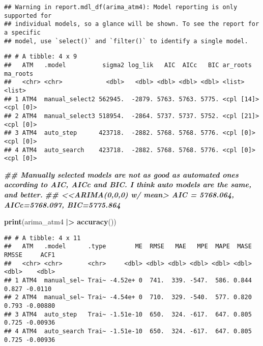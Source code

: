 \documentclass[
]{article}
\newenvironment{Shaded}{\begin{snugshade}}{\end{snugshade}}
\newcommand{\DocumentationTok}[1]{\textcolor[rgb]{0.56,0.35,0.01}{\textbf{\textit{#1}}}}
\newcommand{\FunctionTok}[1]{\textcolor[rgb]{0.13,0.29,0.53}{\textbf{#1}}}
\newcommand{\NormalTok}[1]{#1}
\newcommand{\SpecialCharTok}[1]{\textcolor[rgb]{0.81,0.36,0.00}{\textbf{#1}}}
\begin{document}
\begin{verbatim}
## Warning in report.mdl_df(arima_atm4): Model reporting is only supported for
## individual models, so a glance will be shown. To see the report for a specific
## model, use `select()` and `filter()` to identify a single model.
\end{verbatim}

\begin{verbatim}
## # A tibble: 4 x 9
##   ATM   .model          sigma2 log_lik   AIC  AICc   BIC ar_roots   ma_roots 
##   <chr> <chr>            <dbl>   <dbl> <dbl> <dbl> <dbl> <list>     <list>   
## 1 ATM4  manual_select2 562945.  -2879. 5763. 5763. 5775. <cpl [14]> <cpl [0]>
## 2 ATM4  manual_select3 518954.  -2864. 5737. 5737. 5752. <cpl [21]> <cpl [0]>
## 3 ATM4  auto_step      423718.  -2882. 5768. 5768. 5776. <cpl [0]>  <cpl [0]>
## 4 ATM4  auto_search    423718.  -2882. 5768. 5768. 5776. <cpl [0]>  <cpl [0]>
\end{verbatim}

\begin{Shaded}
\begin{Highlighting}[]
\DocumentationTok{\#\# Manually selected models are not as good as automated ones according to AIC, AICc and BIC. I think auto models are the same, and better.}
\DocumentationTok{\#\# \textless{}\textless{}ARIMA(0,0,0) w/ mean\textgreater{} AIC = 5768.064, AICc=5768.097, BIC=5775.864  }

\FunctionTok{print}\NormalTok{(arima\_atm4 }\SpecialCharTok{|\textgreater{}} \FunctionTok{accuracy}\NormalTok{())}
\end{Highlighting}
\end{Shaded}

\begin{verbatim}
## # A tibble: 4 x 11
##   ATM   .model      .type        ME  RMSE   MAE   MPE  MAPE  MASE RMSSE     ACF1
##   <chr> <chr>       <chr>     <dbl> <dbl> <dbl> <dbl> <dbl> <dbl> <dbl>    <dbl>
## 1 ATM4  manual_sel~ Trai~ -4.52e+ 0  741.  339. -547.  586. 0.844 0.827 -0.0110 
## 2 ATM4  manual_sel~ Trai~ -4.54e+ 0  710.  329. -540.  577. 0.820 0.793 -0.00880
## 3 ATM4  auto_step   Trai~ -1.51e-10  650.  324. -617.  647. 0.805 0.725 -0.00936
## 4 ATM4  auto_search Trai~ -1.51e-10  650.  324. -617.  647. 0.805 0.725 -0.00936
\end{verbatim}
\end{document}
